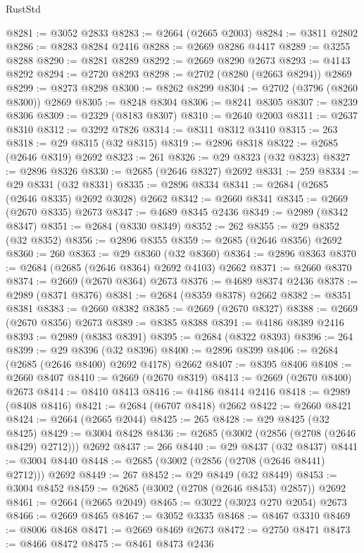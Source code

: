 \begin{lexlean}{RustStd}
\begin{coremodule}
@8281 := @3052 @2833
@8283 := @2664 (@2665 @2003)
@8284 := @3811 @2802
@8286 := @8283 @8284 @2416
@8288 := @2669 @8286 @4417
@8289 := @3255 @8288
@8290 := @8281 @8289
@8292 := @2669 @8290 @2673
@8293 := @4143 @8292
@8294 := @2720 @8293
@8298 := @2702 (@8280 (@2663 @8294)) @2869
@8299 := @8273 @8298
@8300 := @8262 @8299
@8304 := @2702 (@3796 (@8260 @8300)) @2869
@8305 := @8248 @8304
@8306 := @8241 @8305
@8307 := @8239 @8306
@8309 := @2329 (@8183 @8307)
@8310 := @2640 @2003
@8311 := @2637 @8310
@8312 := @3292 @7826
@8314 := @8311 @8312 @3410
@8315 := 263
@8318 := @29 @8315 (@32 @8315)
@8319 := @2896 @8318
@8322 := @2685 (@2646 @8319) @2692
@8323 := 261
@8326 := @29 @8323 (@32 @8323)
@8327 := @2896 @8326
@8330 := @2685 (@2646 @8327) @2692
@8331 := 259
@8334 := @29 @8331 (@32 @8331)
@8335 := @2896 @8334
@8341 := @2684 (@2685 (@2646 @8335) @2692 @3028) @2662
@8342 := @2660 @8341
@8345 := @2669 (@2670 @8335) @2673
@8347 := @4689 @8345 @2436
@8349 := @2989 (@8342 @8347)
@8351 := @2684 (@8330 @8349)
@8352 := 262
@8355 := @29 @8352 (@32 @8352)
@8356 := @2896 @8355
@8359 := @2685 (@2646 @8356) @2692
@8360 := 260
@8363 := @29 @8360 (@32 @8360)
@8364 := @2896 @8363
@8370 := @2684 (@2685 (@2646 @8364) @2692 @4103) @2662
@8371 := @2660 @8370
@8374 := @2669 (@2670 @8364) @2673
@8376 := @4689 @8374 @2436
@8378 := @2989 (@8371 @8376)
@8381 := @2684 (@8359 @8378) @2662
@8382 := @8351 @8381
@8383 := @2660 @8382
@8385 := @2669 (@2670 @8327)
@8388 := @2669 (@2670 @8356) @2673
@8389 := @8385 @8388
@8391 := @4186 @8389 @2416
@8393 := @2989 (@8383 @8391)
@8395 := @2684 (@8322 @8393)
@8396 := 264
@8399 := @29 @8396 (@32 @8396)
@8400 := @2896 @8399
@8406 := @2684 (@2685 (@2646 @8400) @2692 @4178) @2662
@8407 := @8395 @8406
@8408 := @2660 @8407
@8410 := @2669 (@2670 @8319)
@8413 := @2669 (@2670 @8400) @2673
@8414 := @8410 @8413
@8416 := @4186 @8414 @2416
@8418 := @2989 (@8408 @8416)
@8421 := @2684 (@6707 @8418) @2662
@8422 := @2660 @8421
@8424 := @2664 (@2665 @2044)
@8425 := 265
@8428 := @29 @8425 (@32 @8425)
@8429 := @3004 @8428
@8436 := @2685 (@3002 (@2856 (@2708 (@2646 @8429) @2712))) @2692
@8437 := 266
@8440 := @29 @8437 (@32 @8437)
@8441 := @3004 @8440
@8448 := @2685 (@3002 (@2856 (@2708 (@2646 @8441) @2712))) @2692
@8449 := 267
@8452 := @29 @8449 (@32 @8449)
@8453 := @3004 @8452
@8459 := @2685 (@3002 (@2708 (@2646 @8453) @2857)) @2692
@8461 := @2664 (@2665 @2049)
@8465 := @3022 (@3023 @270 @2054) @2673
@8466 := @2669 @8465
@8467 := @3052 @3335
@8468 := @8467 @3310
@8469 := @8006 @8468
@8471 := @2669 @8469 @2673
@8472 := @2750 @8471
@8473 := @8466 @8472
@8475 := @8461 @8473 @2436

\end{coremodule}
\end{lexlean}
